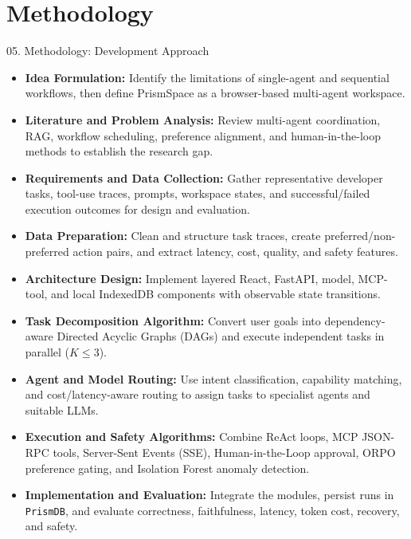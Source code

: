 \documentclass[aspectratio=169,10pt]{beamer}
\begin{document}
\section{Methodology}

\begin{frame}[t]{05. Methodology: Development Approach}
\vspace{-0.15em}
\begin{itemize}\footnotesize\setlength{\itemsep}{4pt}
  \item \textbf{Idea Formulation:} Identify the limitations of single-agent and sequential workflows, then define PrismSpace as a browser-based multi-agent workspace.
  \item \textbf{Literature and Problem Analysis:} Review multi-agent coordination, RAG, workflow scheduling, preference alignment, and human-in-the-loop methods to establish the research gap.
  \item \textbf{Requirements and Data Collection:} Gather representative developer tasks, tool-use traces, prompts, workspace states, and successful/failed execution outcomes for design and evaluation.
  \item \textbf{Data Preparation:} Clean and structure task traces, create preferred/non-preferred action pairs, and extract latency, cost, quality, and safety features.
  \item \textbf{Architecture Design:} Implement layered React, FastAPI, model, MCP-tool, and local IndexedDB components with observable state transitions.
  \item \textbf{Task Decomposition Algorithm:} Convert user goals into dependency-aware Directed Acyclic Graphs (DAGs) and execute independent tasks in parallel ($K \le 3$).
  \item \textbf{Agent and Model Routing:} Use intent classification, capability matching, and cost/latency-aware routing to assign tasks to specialist agents and suitable LLMs.
  \item \textbf{Execution and Safety Algorithms:} Combine ReAct loops, MCP JSON-RPC tools, Server-Sent Events (SSE), Human-in-the-Loop approval, ORPO preference gating, and Isolation Forest anomaly detection.
  \item \textbf{Implementation and Evaluation:} Integrate the modules, persist runs in \texttt{PrismDB}, and evaluate correctness, faithfulness, latency, token cost, recovery, and safety.
\end{itemize}
\end{frame}
\end{document}
